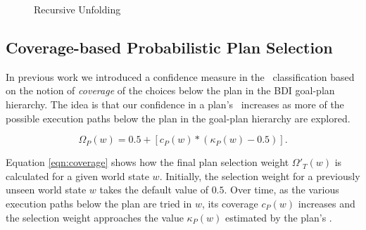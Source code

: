 \begin{figure}[t]
\begin{center}
\resizebox{0.9\textwidth}{!}{}
\end{center}
\caption{Recursive Unfolding}
\label{fig:unfolding}
\end{figure}

\subsection{Coverage-based Probabilistic Plan Selection}

In previous work \cite{Singh:AAMAS10} we introduced a confidence measure in the \dt\ classification based on the notion of \textit{coverage} of the choices below the plan in the BDI goal-plan hierarchy. The idea is that our confidence in a plan's \dt\ increases as more of the possible execution paths below the plan in the goal-plan hierarchy are explored.

\begin{equation*}\label{eqn:coverage}   
\Omega_P(w) = 0.5 + \left[  c_P(w) *  \left( \kappa_P(w) - 0.5 \right)  \right].
\end{equation*}

Equation \ref{eqn:coverage} shows how the final plan selection weight $\Omega'_T(w)$ is calculated for a given world state $w$. Initially, the selection weight for a previously unseen world state $w$ takes the default value of $0.5$. Over time, as the various execution paths below the plan are tried in $w$, its coverage $c_P(w)$ increases and the selection weight approaches the value $\kappa_P(w)$ estimated by the plan's \dt.



